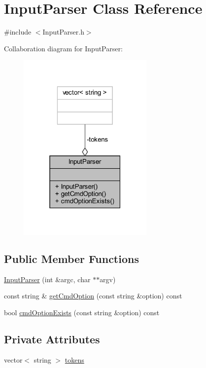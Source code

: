 \hypertarget{class_input_parser}{}\section{Input\+Parser Class Reference}
\label{class_input_parser}


{\ttfamily \#include $<$Input\+Parser.\+h$>$}



Collaboration diagram for Input\+Parser\+:\nopagebreak
\begin{figure}[H]
\begin{center}
\leavevmode
\includegraphics[width=187pt]{class_input_parser__coll__graph}
\end{center}
\end{figure}
\subsection*{Public Member Functions}
\begin{DoxyCompactItemize}
\item 
\hyperlink{class_input_parser_af9fa5ead1f28b5294a713410df5b9531}{Input\+Parser} (int \&argc, char $\ast$$\ast$argv)
\item 
const string \& \hyperlink{class_input_parser_aac05d7ad7794084907a0b57ab3e7d607}{get\+Cmd\+Option} (const string \&option) const
\item 
bool \hyperlink{class_input_parser_ad3d06a9c59e91f425295bdc8408e0544}{cmd\+Option\+Exists} (const string \&option) const
\end{DoxyCompactItemize}
\subsection*{Private Attributes}
\begin{DoxyCompactItemize}
\item 
vector$<$ string $>$ \hyperlink{class_input_parser_a4bd1105d6fc64bd0e825dc2e34515d75}{tokens}
\end{DoxyCompactItemize}


